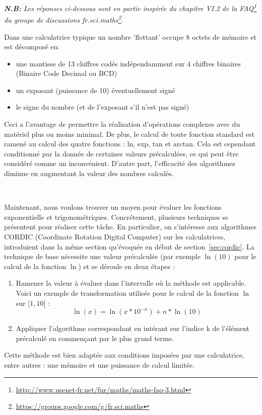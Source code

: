 \documentclass{article}
\begin{document}
{\small \textit{\textbf{N.B:}} \emph{ Les réponses ci-dessous sont en partie inspirée du chapitre VI.2 de la FAQ\footnote{\url{http://www.usenet-fr.net/fur/maths/maths-faq-3.html}} du groupe de discussions fr.sci.maths\footnote{\url{https://groups.google.com/g/fr.sci.maths}}}.
  \vskip 0.01mm ~
 
  Dans une calculatrice typique un nombre 'flottant' occupe 8 octets de m\'emoire et est d\'ecompos\'e en:
  \begin{itemize}
     \item une mantisse de 13 chiffres cod\'es ind\'ependamment sur 4 chiffres binaires (Binaire Code Decimal ou BCD)
     \item un exposant (puissance de 10) \'eventuellement sign\'e
     \item le signe du nombre (et de l'exposant s'il n'est pas sign\'e)
  \end{itemize}

  
  Ceci a l'avantage de permettre la r\'ealisation d'op\'erations complexes avec du mat\'eriel plus ou moins minimal. De plus, le calcul de toute fonction standard est ramen\'e au calcul des quatre fonctions : ln, exp, tan et arctan. Cela est cependant conditionn\'e par la donnée de certaines valeurs pr\'ecalcul\'ees, ce qui peut \^etre consid\'er\'e comme un inconv\'enient. D'autre part, l'efficacit\'e des algorithmes diminue en augmentant la valeur des nombres calcul\'es.

  \vskip 1mm ~


  Maintenant, nous voulons trouver un moyen pour évaluer les fonctions exponentielle et trigonométriques. Concr\'etement, plusieurs techniques se pr\'esentent pour r\'ealiser cette t\^ache. En particulier, on s'int\'eresse aux algorithmes CORDIC (Coordinate Rotation Digital Computer) sur les calculatrices, introduient dans la m\^eme section qu'évoquée en début de section~\ref{sec:cordic}. La technique de base nécessite une valeur pr\'ecalcul\'ee (par exemple $\ln(10)$ pour le calcul de la fonction $\ln$) et se d\'eroule en deux \'etapes :
  \begin{enumerate}
  \item Ramener la valeur à \'evaluer dans l'intervalle où la m\'ethode est applicable. Voici un exemple de transformation utilis\'ee pour le calcul de la fonction $\ln$ sur $[1,10[$ :
      \begin{equation}
        \ln(x) = \ln(x*10^{-n}) + n*\ln(10)
      \end{equation}
    \item Appliquer l'algorithme correspondant en int\'erant sur l'indice k de l'\'el\'ement pr\'ecalcul\'e en commen\c cant par le plus grand terme.
  \end{enumerate}
  Cette m\'ethode est bien adapt\'ee aux conditions impos\'ees par une calculatrice, entre autres : une m\'emoire et une puissance de calcul limit\'ee.

}
\end{document}
